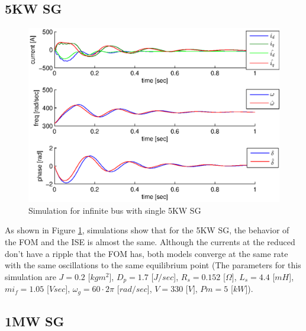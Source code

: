 \documentclass[conference]{IEEEtran}
\begin{document}
\subsection{5KW SG}

\begin{figure}[ht]
\includegraphics[scale=0.6]{sim5KWInfBus}

\caption{Simulation for infinite bus with single 5KW SG}
\label{fig:InfBusOne5KWSG}
\end{figure}


As shown in Figure \ref{fig:InfBusOne5KWSG}, simulations show that
for the 5KW SG, the behavior of the FOM and the ISE is almost the same. Although the currents at the reduced don't
have a ripple that the FOM has, both models converge
at the same rate with the same oscillations to the same equilibrium
point (The parameters for this simulation are $J=0.2$ {[}$kgm^{2}${]},
$D_{p}=1.7$ {[}$J/sec${]}, $R_{s}=0.152$ {[}$\Omega]$, $L_{s}=4.4$
{[}$mH${]}, $mi_{f}=1.05$ {[}$Vsec]$, $\omega_{g}=60\cdotp2\pi$
{[}$rad/sec${]}, $V=330$ {[}$V]$, $Pm=5$ {[}$kW${]}). 

\subsection{1MW SG}
\end{document}
